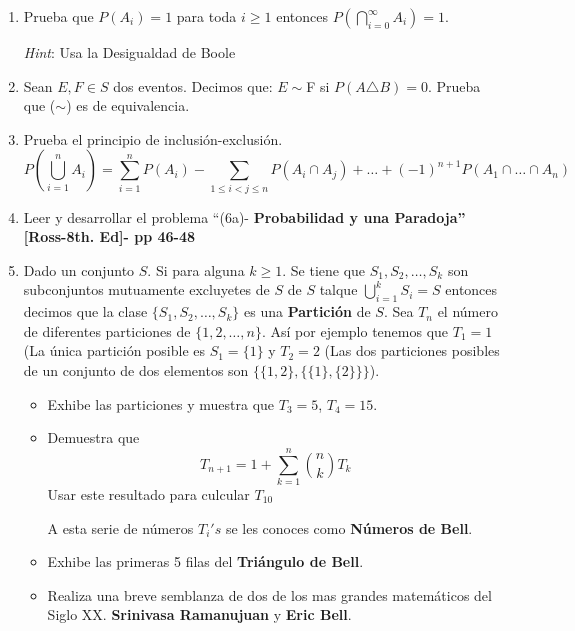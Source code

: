 \documentclass[11pt,letterpaper]{report}
\begin{document}
\begin{enumerate}
\item Prueba que $P(A_i) = 1$ para toda $i \geq 1$ entonces $P(\bigcap_{i=0}^{\infty} A_i) = 1$.

\textit{Hint}: Usa la Desigualdad de Boole

\item Sean $E,F \in S$ dos eventos. Decimos que: $E \sim $F si $P(A \triangle B) = 0$.
Prueba que ($\sim$) es de equivalencia.

\item Prueba el principio de inclusión-exclusión.
\[
    P(\bigcup_{i=1}^{n} A_i) = \sum_{i=1}^{n} P(A_i) - \sum_{1 \leq i < j \leq n } P(A_i \cap A_j)
    + \ldots + (-1)^{n+1} P(A_1 \cap \ldots \cap A_n)
\]

\item Leer y desarrollar el problema ``(6a)- \textbf{Probabilidad y una Paradoja''
[Ross-8th. Ed]- pp 46-48}

\item Dado un conjunto $S$. Si para alguna $k \geq 1$. Se tiene que $S_1, S_2, \ldots, S_k$ son
subconjuntos mutuamente excluyetes de $S$ de $S$ talque $\bigcup_{i=1}^{k} S_i = S$ entonces decimos
que la clase $\{ S_1, S_2, \ldots, S_k \}$ es una \textbf{Partición} de $S$. Sea $T_n$ el número
de diferentes particiones de $\{ 1, 2, \ldots , n \}$. Así por ejemplo tenemos que
$T_1 = 1$ (La única partición posible es $S_1 = \{ 1 \}$ y $T_2 = 2$ (Las dos particiones
posibles de un conjunto de dos elementos son $\{ \{ 1, 2 \}, \{ \{ 1 \}, \{ 2 \} \} \}$).

\begin{itemize}
    \item Exhibe las particiones y muestra que $T_3 = 5$, $T_4 = 15$.
    \item Demuestra que
    \[
        T_{n+1} = 1 + \sum_{k=1}^{n} \binom{n}{k} T_k
    \]
    Usar este resultado para culcular $T_{10}$

    A esta serie de números $T_i's$ se les conoces como \textbf{Números de Bell}.

    \item Exhibe las primeras 5 filas del \textbf{Triángulo de Bell}.
    
    \item Realiza una breve semblanza de dos de los mas grandes matemáticos del Siglo XX.
    \textbf{Srinivasa Ramanujuan} y \textbf{Eric Bell}.


\end{itemize}

    
\end{enumerate}





\end{document}
